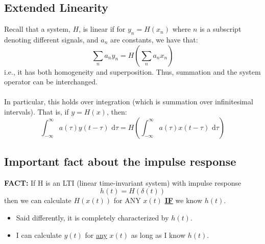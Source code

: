 \documentclass[10pt]{article}
\begin{document}
\subsection*{Extended Linearity}
Recall that a system, $H$, is linear if for $y_n = H(x_n)$ where $n$ is a subscript denoting different signals, and $a_n$ are constants, we have that:
\[\sum_n a_n y_n = H\left(\sum_n a_n x_n\right)\]
i.e., it has both homogeneity and superposition.  Thus, summation and the system operator can be interchanged.\\\\
In particular, this holds over integration (which is summation over infinitesimal intervals).  That is, if $y = H(x)$, then:
\[\int_{-\infty}^\infty a(\tau) y(t - \tau) \text{ d} \tau = H\left(\int_{-\infty}^\infty a(\tau) x(t - \tau) \text{ d}\tau\right)\]

\subsection*{Important fact about the impulse response}
\textbf{FACT:} If H is an LTI (linear time-invariant system) with impulse response
\[h(t) = H(\delta(t))\]
then we can calculate $H(x(t))$ for ANY $x(t)$ \textbf{\underline{IF}} we know $h(t)$.
\begin{itemize}
    \item Said differently, it is completely characterized by $h(t)$.  
    \item I can calculate $y(t)$ for \underline{any} $x(t)$ as long as I know $h(t)$.
\end{itemize}
\end{document}
